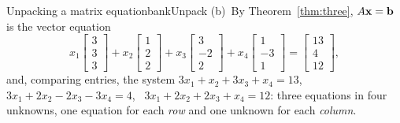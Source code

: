 \documentclass[11pt]{article}
\begin{document}
\begin{exmp}{Unpacking a matrix equation}{bankUnpack}
(b)~By Theorem~\ref{thm:three}, $A\mathbf{x}=\mathbf{b}$ is the vector equation
\[
x_1\begin{bmatrix}3\\3\\3\end{bmatrix}+x_2\begin{bmatrix}1\\2\\2\end{bmatrix}+x_3\begin{bmatrix}3\\-2\\2\end{bmatrix}+x_4\begin{bmatrix}1\\-3\\1\end{bmatrix}=\begin{bmatrix}13\\4\\12\end{bmatrix},
\]
and, comparing entries, the system $3x_1+x_2+3x_3+x_4=13$, \ $3x_1+2x_2-2x_3-3x_4=4$, \ $3x_1+2x_2+2x_3+x_4=12$: three equations in four unknowns, one equation for each \emph{row} and one unknown for each \emph{column}.


\end{exmp}
\end{document}
